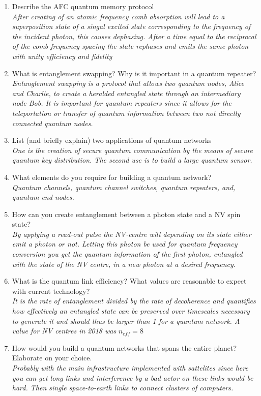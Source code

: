 \documentclass[a4paper]{scrartcl}
\newcommand{\qa}[2]{#1\\ \textit{#2}}
\begin{document}
\begin{enumerate}[label=(\alph*)]
  \item \qa{Describe the AFC quantum memory protocol}{After creating of an atomic frequency comb absorption will lead to a superposition state of a singal excited state corresponding to the frequency of the incident photon, this causes dephasing. After a time equal to the reciprocal of the comb frequency spacing the state rephases and emits the same photon with unity efficiency and fidelity}
  \item \qa{What is entanglement swapping? Why is it important in a quantum repeater?}{Entanglement swapping is a protocol that allows two quantum nodes, Alice and Charlie, to create a heralded entangled state through an intermediary node Bob. It is important for quantum repeaters since it allows for the teleportation or transfer of quantum information between two not directly connected quantum nodes.}
  \item \qa{List (and briefly explain) two applications of quantum networks}{One is the creation of secure quantum communication by the means of secure quantum key distribution. The second use is to build a large quantum sensor.}
  \item \qa{What elements do you require for building a quantum network?}{Quantum channels, quantum channel switches, quantum repeaters, and, quantum end nodes.}
  \item \qa{How can you create entanglement between a photon state and a NV spin state?}{By applying a read-out pulse the NV-centre will depending on its state either emit a photon or not. Letting this photon be used for quantum frequency conversion you get the quantum information of the first photon, entangled with the state of the NV centre, in a new photon at a desired frequency.}
  \item \qa {What is the quantum link efficiency? What values are reasonable to expect with current technology?}{It is the rate of entanglement divided by the rate of decoherence and quantifies how effectively an entangled state can be preserved over timescales necessary to generate it and should thus be larger than 1 for a quantum network. A value for NV centres in 2018 was }$n_{eff}=8$ \textit{}
  \item \qa{How would you build a quantum networks that spans the entire planet? Elaborate on your choice.}{Probably with the main infrastructure implemented with sattelites since here you can get long links and interference by a bad actor on these links would be hard. Then single space-to-earth links to connect clusters of computers.}
\end{enumerate}
\end{document}
